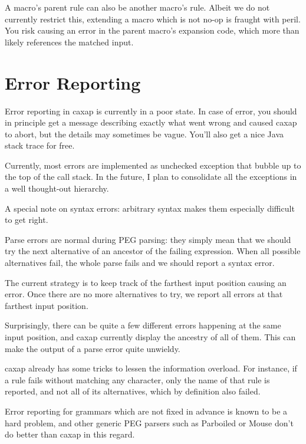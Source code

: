A macro's parent rule can also be another macro's rule. Albeit we do not
currently restrict this, extending a macro which is not no-op is fraught with
peril. You risk causing an error in the parent macro's expansion code, which
more than likely references the matched input.

\section{Error Reporting}
\label{error_reporting_manual}

Error reporting in caxap is currently in a poor state. In case of error, you
should in principle get a message describing exactly what went wrong and caused
caxap to abort, but the details may sometimes be vague. You'll also get a nice
Java stack trace for free.

Currently, most errors are implemented as unchecked exception that bubble up to
the top of the call stack. In the future, I plan to consolidate all the
exceptions in a well thought-out hierarchy.

A special note on syntax errors: arbitrary syntax makes them especially
difficult to get right.

Parse errors are normal during PEG parsing: they simply mean that we should try
the next alternative of an ancestor of the failing expression. When all possible
alternatives fail, the whole parse fails and we should report a syntax error.

The current strategy is to keep track of the farthest input position causing an
error. Once there are no more alternatives to try, we report all errors at that
farthest input position.

Surprisingly, there can be quite a few different errors happening at the same
input position, and caxap currently display the ancestry of all of them. This
can make the output of a parse error quite unwieldy.

caxap already has some tricks to lessen the information overload. For instance,
if a rule fails without matching any character, only the name of that rule is
reported, and not all of its alternatives, which by definition also failed.

Error reporting for grammars which are not fixed in advance is known to be a
hard problem, and other generic PEG parsers such as Parboiled \cite{parboiled}
or Mouse \cite{redziejowski2009} don't do better than caxap in this regard.

